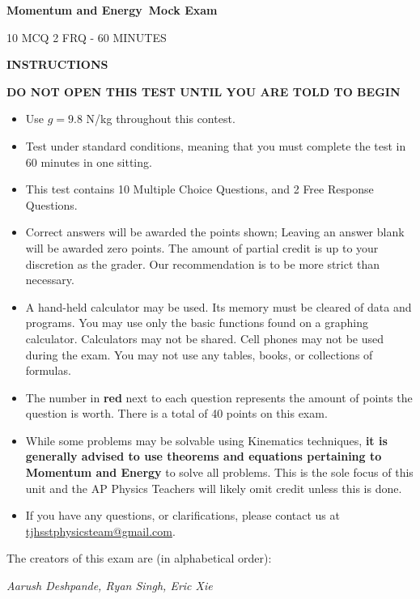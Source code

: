 \documentclass[12pt]{article}
\newcommand{\ptfmt}[1]{\textbf{\color{ptred}#1\color{black}}}
\theoremstyle{mystyle}
\newcommand\mocktitle{Momentum and Energy}
\begin{document}
\begin{center}
    \Large \textbf{\mocktitle\ Mock Exam} \vspace{4mm}
    
    \Large 10 MCQ 2 FRQ - 60 MINUTES \vspace{4mm}
    
    \Large \textbf{INSTRUCTIONS} \linebreak[2]
    
    \normalsize \textbf{DO NOT OPEN THIS TEST UNTIL YOU ARE TOLD TO BEGIN}
\end{center}

\begin{itemize}
    \item Use $g = 9.8$ N/kg throughout this contest.
    \item Test under standard conditions, meaning that you must complete the test in 60 minutes in one sitting.
    \item This test contains 10 Multiple Choice Questions, and 2 Free Response Questions.
    \item Correct answers will be awarded the points shown; Leaving an answer blank will be awarded zero points. The amount of partial credit is up to your discretion as the grader. Our recommendation is to be
    more strict than necessary.
    \item A hand-held calculator may be used. Its memory must be cleared of data and programs. You may use only the basic functions found on a graphing calculator. Calculators may not be shared. Cell phones may not be used during the exam. You may not use any tables, books, or collections of formulas.
    \item The number in \ptfmt{red} next to each question represents the amount of points the question is worth. There is a total of 40 points on this exam.
    \item While some problems may be solvable using Kinematics techniques, \textbf{it is generally advised to use theorems and equations pertaining to Momentum and Energy} to solve all problems. This is the sole focus of this unit and the AP Physics Teachers will likely omit credit unless this is done.
    \item If you have any questions, or clarifications, please contact us at \href{mailto:tjhsstphysicsteam@gmail.com}{tjhsstphysicsteam@gmail.com}.
\end{itemize}
\vspace{7mm}

The creators of this exam are (in alphabetical order):
\vspace{1mm}
\begin{center}
    \textit{Aarush Deshpande, Ryan Singh, Eric Xie}
\end{center}
\end{document}
